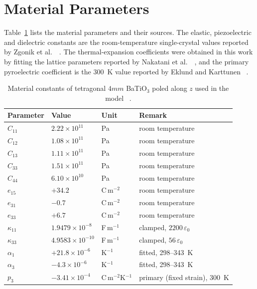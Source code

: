 \documentclass[pdflatex,sn-mathphys-num]{sn-jnl}
\begin{document}
\section{Material Parameters}
\label{sec:materials}

Table~\ref{tab:materials} lists the material parameters and their sources. The elastic,
piezoelectric and dielectric constants are the room-temperature single-crystal values
reported by Zgonik et al.\ ~\cite{Zgonik1994}. The thermal-expansion coefficients were
obtained in this work by fitting the lattice parameters reported by Nakatani et al.\
~\cite{Nakatani2016}, and the primary pyroelectric coefficient is the 300~K value
reported by Eklund and Karttunen ~\cite{EklundKarttunen2023}.

\begin{table}[t]
\centering
\small
\caption{Material constants of tetragonal $4mm$ BaTiO$_3$ poled along $z$ used in
the model ~\cite{Zgonik1994,Nakatani2016,EklundKarttunen2023}.}
\label{tab:materials}
\begin{tabular}{@{}llll@{}}
\toprule
Parameter & Value & Unit & Remark \\
\midrule
$C_{11}$ & $2.22\times10^{11}$ & Pa & room temperature \\
$C_{12}$ & $1.08\times10^{11}$ & Pa & room temperature \\
$C_{13}$ & $1.11\times10^{11}$ & Pa & room temperature \\
$C_{33}$ & $1.51\times10^{11}$ & Pa & room temperature \\
$C_{44}$ & $6.10\times10^{10}$ & Pa & room temperature \\
$e_{15}$ & $+34.2$ & C\,m$^{-2}$ & room temperature \\
$e_{31}$ & $-0.7$ & C\,m$^{-2}$ & room temperature \\
$e_{33}$ & $+6.7$ & C\,m$^{-2}$ & room temperature \\
$\kappa_{11}$ & $1.9479\times10^{-8}$ & F\,m$^{-1}$ & clamped, $2200\,\varepsilon_0$ \\
$\kappa_{33}$ & $4.9583\times10^{-10}$ & F\,m$^{-1}$ & clamped, $56\,\varepsilon_0$ \\
$\alpha_1$ & $+21.8\times10^{-6}$ & K$^{-1}$ & fitted, 298--343~K \\
$\alpha_3$ & $-4.3\times10^{-6}$ & K$^{-1}$ & fitted, 298--343~K \\
$p_3$ & $-3.41\times10^{-4}$ & C\,m$^{-2}$K$^{-1}$ & primary (fixed strain), 300~K \\
\bottomrule
\end{tabular}
\end{table}
\end{document}
